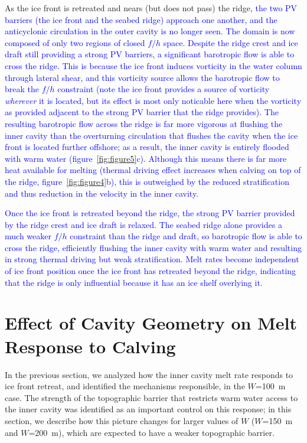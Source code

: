 \documentclass[draft]{agujournal2019}
\newcommand{\blue}[1]{\textcolor{blue}{#1}}
\begin{document}
As the ice front is retreated and nears (but does not pass) the ridge, \blue{the two PV barriers (the ice front and the seabed ridge) approach one another, and the anticyclonic circulation in the outer cavity is no longer seen. The domain is now composed of only two regions of closed $f/h$ space. Despite the ridge crest and ice draft still providing a strong PV barriers, a significant barotropic flow is able to cross the ridge. This is because the ice front induces vorticity in the water column through lateral shear, and this vorticity source allows the barotropic flow to break the $f/h$ constraint (note the ice front provides a source of vorticity \emph{wherever} it is located, but its effect is most only noticable here when the vorticity as provided adjacent to the strong PV barrier that the ridge provides).  The resulting barotropic flow across the ridge is far more vigorous at flushing the inner cavity than the overturning circulation that flushes the cavity when the ice front is located further offshore; as a result, the inner cavity is entirely flooded with warm water (figure~\ref{fig:figure5}c). Although this means there is far more heat available for melting (thermal driving effect increases when calving on top of the ridge, figure~\ref{fig:figure4}b), this is outweighed by the reduced stratification and thus reduction in the velocity in the inner cavity.}

\textcolor{blue}{Once the ice front is retreated beyond the ridge, the strong PV barrier provided by the ridge crest and ice draft is relaxed. The seabed ridge alone provides a much weaker $f/h$ constraint than the ridge and draft, so barotropic flow is able to cross the ridge, efficiently flushing the inner cavity with warm water and resulting in strong thermal driving but weak stratification. Melt rates become independent of ice front position once the ice front has retreated beyond the ridge, indicating that the ridge is only influential because it has an ice shelf overlying it.}


\section{Effect of Cavity Geometry on Melt Response to Calving}\label{S:Results:H}
In the previous section, we analyzed how the inner cavity melt rate responds to ice front retreat, and identified the mechanisms responsible, in the $W$=100~m case. The strength of the topographic barrier that restricts warm water access to the inner cavity was identified as an important control on this response; in this section, we describe how this picture changes for larger values of $W$ ($W$=150~m and $W$=200~m), which are expected to have a weaker topographic barrier.
\end{document}
